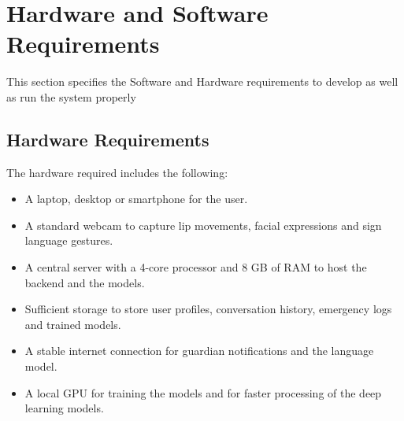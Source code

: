 \documentclass{FastFyp}
\begin{document}


\section{Hardware and Software Requirements}
This section specifies the Software and Hardware requirements to develop as well as run the system properly
\subsection{Hardware Requirements}
The hardware required includes the following: 
\begin{itemize}
  \item A laptop, desktop or smartphone for the user.
  \item A standard webcam to capture lip movements, facial expressions and sign language gestures.
  \item A central server with a 4-core processor and 8 GB of RAM to host the backend and the models.
  \item Sufficient storage to store user profiles, conversation history, emergency logs and trained models.
  \item A stable internet connection for guardian notifications and the language model.
  \item A local GPU for training the models and for faster processing of the deep learning models.
\end{itemize}
\end{document}
